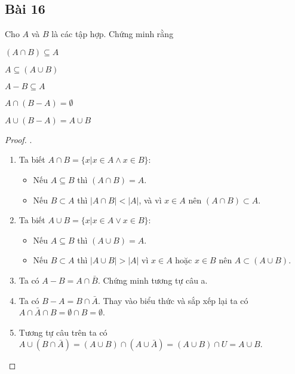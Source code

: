 \subsection*{Bài 16}
Cho $A$ và $B$ là các tập hợp. Chứng minh rằng
\begin{enumerate}[label=\alph*)]
    \begin{multicols}{2}
        \item $(A\cap B)\subseteq A$
        \item $A\subseteq(A\cup B)$
        \item $A-B\subseteq A$
        \item $A\cap(B-A)=\emptyset$
        \item $A\cup(B-A)=A\cup B$
    \end{multicols}
\end{enumerate}
\begin{proof}.
    \begin{enumerate}[label=\alph*)]
        \item Ta biết $A\cap B=\{x|x\in A\land x\in B\}$:
            \begin{itemize}
                \item Nếu $A\subseteq B$ thì $(A\cap B)=A$.
                \item Nếu $B\subset A$ thì $|A\cap B|<|A|$, và vì $x\in A$ nên $(A\cap B)\subset A$. 
            \end{itemize}
        \item Ta biết $A\cup B=\{x|x\in A\lor x\in B\}$:
        \begin{itemize}
            \item Nếu $A\subseteq B$ thì $(A\cup B)=A$.
            \item Nếu $B\subset A$ thì $|A\cup B|>|A|$ vì $x\in A$ hoặc $x\in B$ nên $A\subset(A\cup B)$. 
        \end{itemize}
        \item Ta có $A-B=A\cap\bar B$. Chứng minh tương tự câu a.
        \item Ta có $B-A=B\cap\bar A$. Thay vào biểu thức và sắp xếp lại ta có $A\cap\bar A\cap B=\emptyset\cap B=\emptyset$.
        \item Tương tự câu trên ta có $A\cup (B\cap\bar A)=(A\cup B)\cap(A\cup\bar A)=(A\cup B)\cap U=A\cup B$.
    \end{enumerate}
\end{proof}

